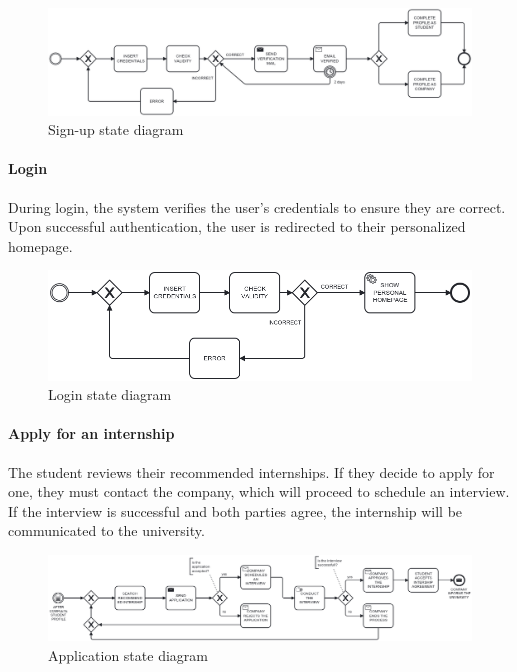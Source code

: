 \begin{figure}[H]
    \centering
    \includegraphics[width=1\linewidth]{Images//state diagrams/SIGNUP.png}
    \caption{Sign-up state diagram}
    \label{fig:enter-label}
\end{figure}

\paragraph{Login} During login, the system verifies the user's credentials to ensure they are correct. Upon successful authentication, the user is redirected to their personalized homepage.

\begin{figure}[H]
    \centering
    \includegraphics[width=1\linewidth]{Images//state diagrams/LOGIN.png}
    \caption{Login state diagram}
    \label{fig:enter-label}
\end{figure}

\paragraph{Apply for an internship} The student reviews their recommended internships. If they decide to apply for one, they must contact the company, which will proceed to schedule an interview. If the interview is successful and both parties agree, the internship will be communicated to the university.

\begin{figure}[H]
    \centering
    \includegraphics[width=1\linewidth]{Images//state diagrams/APPLICATION.png}
    \caption{Application state diagram}
    \label{fig:enter-label}
\end{figure}

